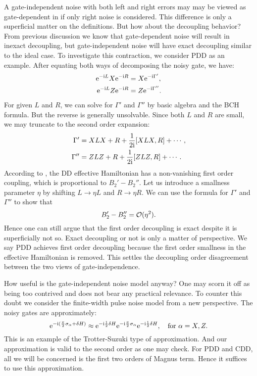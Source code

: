 \documentclass[pra,reprint,superscriptaddress]{revtex4-2}
\begin{document}
A gate-independent noise with both left and right errors may may be viewed as gate-dependent in if only right noise is considered. This difference is only a superficial matter on the definitions. But how about the decoupling behavior? 
From previous discussion we know that gate-dependent noise will result in inexact decoupling, but gate-independent noise will have exact decoupling similar to the ideal case. To investigate this contraction, we consider PDD as an example. After equating both ways of decomposing the noisy gate, we have:
\begin{equation}
 \begin{split}
  \mathrm{e}^{-\mathrm{i} L} X \mathrm{e}^{-\mathrm{i} R} &=  X \mathrm{e}^{-\mathrm{i} \Gamma'},\\
  \mathrm{e}^{-\mathrm{i} L} Z\mathrm{e}^{-\mathrm{i} R} &=  Z \mathrm{e}^{-\mathrm{i} \Gamma''}.
 \end{split}
\end{equation}
For given $L$ and $R$, we can solve for $\Gamma'$ and $\Gamma''$ by basic algebra and the BCH formula. But the reverse is generally unsolvable. Since both $L$ and $R$ are small, we may truncate to the second order expansion:
\begin{equation}
 \begin{aligned}
  \Gamma' &= XLX +R + \frac{1}{2\mathrm{i}} [XLX, R ] + \cdots, \\
   \Gamma'' &= ZLZ +R + \frac{1}{2\mathrm{i}} [ZLZ, R ] + \cdots. 
 \end{aligned}
\end{equation}
According to , the DD effective Hamiltonian has a non-vanishing  first order  coupling, which is proportional to $B_2'-B_2''$. 
Let us introduce a smallness parameter $\eta$ by shifting $L\to \eta L$ and $R\to \eta R$. We can use the formula for $\Gamma'$ and $\Gamma''$ to show that 
\begin{equation}
 B_2'-B_2''=\mathcal{O}(\eta^2).
\end{equation}
Hence one can still argue that the first order decoupling is exact despite it is superficially not so. Exact decoupling or not is only a matter of perspective. We say PDD achieves first order decoupling because the first order smallness in the effective Hamiltonian is removed. This settles the decoupling order disagreement between the two views of gate-independence. 

How useful is the gate-independent noise model anyway? One may scorn it off as being too contrived and does not bear any practical relevance. To counter this doubt we consider the finite-width pulse noise model from a new perspective. The noisy gates are approximately:
\begin{equation}
 \mathrm{e}^{-\mathrm{i} (\frac{\pi}{2}\sigma_\alpha + \delta H)} \approx \mathrm{e}^{-\mathrm{i}  \frac{1}{2}\delta H} \mathrm{e}^{-\mathrm{i} \frac{\pi}{2}\sigma_\alpha} \mathrm{e}^{-\mathrm{i}  \frac{1}{2}\delta H}, \quad\text{for }\alpha=X,Z.
\end{equation}
This is an example of the Trotter-Suzuki type of approximation. And 
our approximation is valid to the second order as one may check. For PDD and CDD, all we will be concerned is the first two orders of Magnus term. Hence it suffices to use this approximation.
\end{document}
